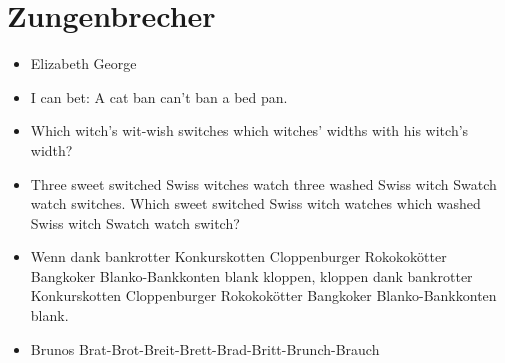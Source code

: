 \section{Zungenbrecher}
\begin{itemize}
  \item Elizabeth George
  \item I can bet: A cat ban can't ban a bed pan.
  \item Which witch's wit-wish switches which witches' widths with his witch's width?
  \item Three sweet switched Swiss witches watch three washed Swiss witch Swatch watch switches. Which sweet switched Swiss witch watches which washed Swiss witch Swatch watch switch?
  \item Wenn dank bankrotter Konkurskotten Cloppenburger Rokokokötter Bangkoker Blanko-Bankkonten blank kloppen, kloppen dank bankrotter Konkurskotten Cloppenburger Rokokokötter Bangkoker Blanko-Bankkonten blank.
  \item Brunos Brat-Brot-Breit-Brett-Brad-Britt-Brunch-Brauch
\end{itemize}
